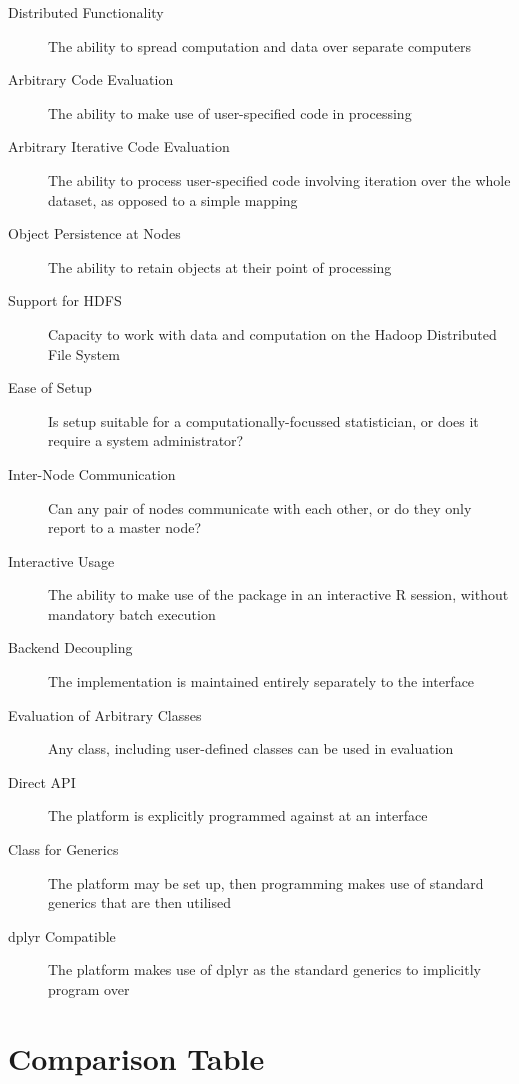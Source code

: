 \documentclass[a4paper,10pt]{article}
\begin{document}
\begin{description}
	\item[Distributed Functionality] The ability to spread computation and data
	      over separate computers
	\item[Arbitrary Code Evaluation] The ability to make use of user-specified code
	      in processing
	\item[Arbitrary Iterative Code Evaluation] The ability to process
	      user-specified code involving iteration over the whole dataset, as opposed to a
	      simple mapping
	\item[Object Persistence at Nodes] The ability to retain objects at their point
	      of processing
	\item[Support for HDFS] Capacity to work with data and computation on the
	      Hadoop Distributed File System
	\item[Ease of Setup] Is setup suitable for a computationally-focussed
	      statistician, or does it require a system administrator?
	\item[Inter-Node Communication] Can any pair of nodes communicate with each
	      other, or do they only report to a master node?
	\item[Interactive Usage] The ability to make use of the package in an
	      interactive R session, without mandatory batch execution
	\item[Backend Decoupling] The implementation is maintained entirely separately
	      to the interface
	\item[Evaluation of Arbitrary Classes] Any class, including user-defined
	      classes can be used in evaluation
	\item[Direct API] The platform is explicitly programmed against at an interface
	\item[Class for Generics] The platform may be set up, then programming makes
	      use of standard generics that are then utilised
	\item[dplyr Compatible] The platform makes use of dplyr as the standard
	      generics to implicitly program over
\end{description}

\section{Comparison Table}\label{sec:comp-tab}
\end{document}
